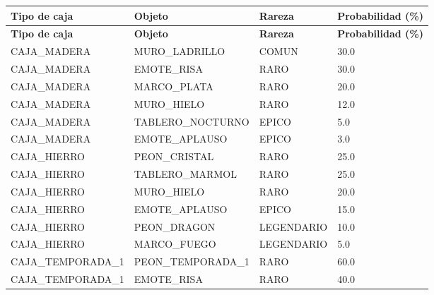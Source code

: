 \begin{center}\footnotesize\setlength{\tabcolsep}{2pt}
\begin{longtable}{|L{147.4pt}|L{155.3pt}|L{95.0pt}|L{55.7pt}|}
\hline
\textbf{\hspace{0pt}Tipo de caja} & \textbf{\hspace{0pt}Objeto} & \textbf{\hspace{0pt}Rareza} & \textbf{\hspace{0pt}Probabilidad (\%)} \\ \hline
\endfirsthead
\hline
\textbf{\hspace{0pt}Tipo de caja} & \textbf{\hspace{0pt}Objeto} & \textbf{\hspace{0pt}Rareza} & \textbf{\hspace{0pt}Probabilidad (\%)} \\ \hline
\endhead
CAJA\_\allowbreak{}MADERA & MURO\_\allowbreak{}LADRILLO & COMUN & 30.0 \\ \hline
CAJA\_\allowbreak{}MADERA & EMOTE\_\allowbreak{}RISA & RARO & 30.0 \\ \hline
CAJA\_\allowbreak{}MADERA & MARCO\_\allowbreak{}PLATA & RARO & 20.0 \\ \hline
CAJA\_\allowbreak{}MADERA & MURO\_\allowbreak{}HIELO & RARO & 12.0 \\ \hline
CAJA\_\allowbreak{}MADERA & TABLERO\_\allowbreak{}NOCTURNO & EPICO & 5.0 \\ \hline
CAJA\_\allowbreak{}MADERA & EMOTE\_\allowbreak{}APLAUSO & EPICO & 3.0 \\ \hline
CAJA\_\allowbreak{}HIERRO & PEON\_\allowbreak{}CRISTAL & RARO & 25.0 \\ \hline
CAJA\_\allowbreak{}HIERRO & TABLERO\_\allowbreak{}MARMOL & RARO & 25.0 \\ \hline
CAJA\_\allowbreak{}HIERRO & MURO\_\allowbreak{}HIELO & RARO & 20.0 \\ \hline
CAJA\_\allowbreak{}HIERRO & EMOTE\_\allowbreak{}APLAUSO & EPICO & 15.0 \\ \hline
CAJA\_\allowbreak{}HIERRO & PEON\_\allowbreak{}DRAGON & LEGENDARIO & 10.0 \\ \hline
CAJA\_\allowbreak{}HIERRO & MARCO\_\allowbreak{}FUEGO & LEGENDARIO & 5.0 \\ \hline
CAJA\_\allowbreak{}TEMPORADA\_\allowbreak{}1 & PEON\_\allowbreak{}TEMPORADA\_\allowbreak{}1 & RARO & 60.0 \\ \hline
CAJA\_\allowbreak{}TEMPORADA\_\allowbreak{}1 & EMOTE\_\allowbreak{}RISA & RARO & 40.0 \\ \hline
\end{longtable}
\end{center}
